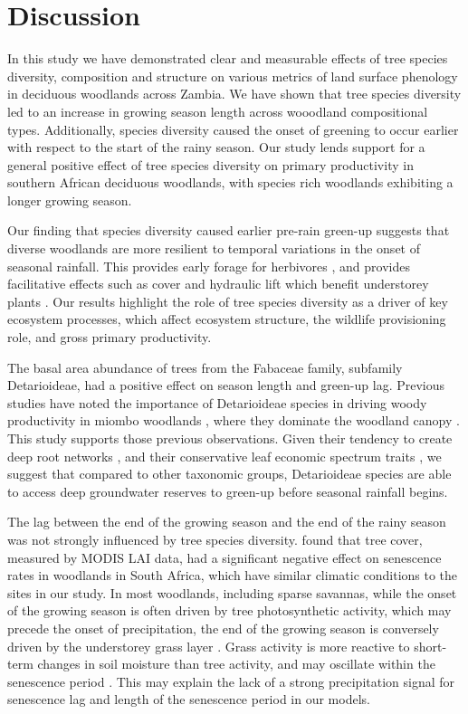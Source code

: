 \documentclass[11pt,a4paper]{article}
\begin{document}
\section{Discussion}

In this study we have demonstrated clear and measurable effects of tree species diversity, composition and structure on various metrics of land surface phenology in deciduous woodlands across Zambia. We have shown that tree species diversity led to an increase in growing season length across wooodland compositional types. Additionally, species diversity caused the onset of greening to occur earlier with respect to the start of the rainy season. Our study lends support for a general positive effect of tree species diversity on primary productivity in southern African deciduous woodlands, with species rich woodlands exhibiting a longer growing season.

Our finding that species diversity caused earlier pre-rain green-up suggests that diverse woodlands are more resilient to temporal variations in the onset of seasonal rainfall. This provides early forage for herbivores \citep{Morellato2016}, and provides facilitative effects such as cover and hydraulic lift which benefit understorey plants \citep{Domec2010, Yu2015}. Our results highlight the role of tree species diversity as a driver of key ecosystem processes, which affect ecosystem structure, the wildlife provisioning role, and gross primary productivity. 

The basal area abundance of trees from the Fabaceae family, subfamily Detarioideae, had a positive effect on season length and green-up lag. Previous studies have noted the importance of Detarioideae species in driving woody productivity in miombo woodlands \citep{Ryan2017}, where they dominate the woodland canopy \citep{Godlee2021, Chidumayo2001}. This study supports those previous observations. Given their tendency to create deep root networks \citep{Zhou2020}, and their conservative leaf economic spectrum traits \citep{Wigley2016}, we suggest that compared to other taxonomic groups, Detarioideae species are able to access deep groundwater reserves to green-up before seasonal rainfall begins.

The lag between the end of the growing season and the end of the rainy season was not strongly influenced by tree species diversity. \citet{Cho2017} found that tree cover, measured by MODIS LAI data, had a significant negative effect on senescence rates in woodlands in South Africa, which have similar climatic conditions to the sites in our study. In most woodlands, including sparse savannas, while the onset of the growing season is often driven by tree photosynthetic activity, which may precede the onset of precipitation, the end of the growing season is conversely driven by the understorey grass layer \citep{Cho2017, Guan2014}. Grass activity is more reactive to short-term changes in soil moisture than tree activity, and may oscillate within the senescence period \citep{Archibald2007}. This may explain the lack of a strong precipitation signal for senescence lag and length of the senescence period in our models.
\end{document}
